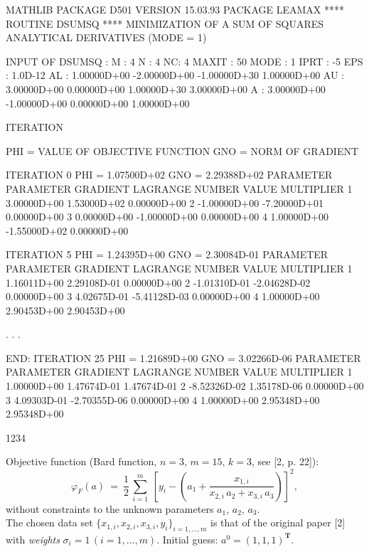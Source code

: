 \begin{Listing}
               MATHLIB PACKAGE   D501   VERSION 15.03.93
               PACKAGE LEAMAX  ****  ROUTINE DSUMSQ ****
   MINIMIZATION OF A SUM OF SQUARES   ANALYTICAL DERIVATIVES (MODE = 1)
 
INPUT  OF  DSUMSQ :
M :  4     N :  4     NC:  4    MAXIT :  50    MODE :  1    IPRT :  -5
EPS :  1.0D-12
AL :   1.00000D+00   -2.00000D+00   -1.00000D+30    1.00000D+00
AU :   3.00000D+00    0.00000D+00    1.00000D+30    3.00000D+00
A  :   3.00000D+00   -1.00000D+00    0.00000D+00    1.00000D+00
 
ITERATION
 
    PHI = VALUE OF OBJECTIVE FUNCTION          GNO = NORM OF GRADIENT
 
       ITERATION   0   PHI =  1.07500D+02      GNO =  2.29388D+02
       PARAMETER       PARAMETER         GRADIENT          LAGRANGE
         NUMBER          VALUE                            MULTIPLIER
            1          3.00000D+00      1.53000D+02      0.00000D+00
            2         -1.00000D+00     -7.20000D+01      0.00000D+00
            3          0.00000D+00     -1.00000D+00      0.00000D+00
            4          1.00000D+00     -1.55000D+02      0.00000D+00
 
       ITERATION   5   PHI =  1.24395D+00      GNO =  2.30084D-01
       PARAMETER       PARAMETER         GRADIENT          LAGRANGE
         NUMBER          VALUE                            MULTIPLIER
            1          1.16011D+00      2.29108D-01      0.00000D+00
            2         -1.01310D-01     -2.04628D-02      0.00000D+00
            3          4.02675D-01     -5.41128D-03      0.00000D+00
            4          1.00000D+00      2.90453D+00      2.90453D+00
 
      . . .
 
 END:  ITERATION  25   PHI =  1.21689D+00      GNO =  3.02266D-06
       PARAMETER       PARAMETER         GRADIENT          LAGRANGE
         NUMBER          VALUE                            MULTIPLIER
            1          1.00000D+00      1.47674D-01      1.47674D-01
            2         -8.52326D-02      1.35178D-06      0.00000D+00
            3          4.09303D-01     -2.70355D-06      0.00000D+00
            4          1.00000D+00      2.95348D+00      2.95348D+00
\end{Listing}
\newpage  
\begin{DL}{1234}
\item[\mathbf{(F)}]
Objective function (Bard function, $n=3,\,m=15,\,k=3$, see [2, p. 22]):
$$ \varphi_F(a) \ = \ \frac{1}{2} \, \sum_{i=1}^m \:
\left[y_i-\left(a_1+\frac{x_{1,i}}{x_{2,i}\,a_2+x_{3,i}\,a_3}\right)
\right]^2, $$
without constraints to the unknown parameters $a_1$, $a_2$, $a_3$. \\
The chosen data set $\{x_{1,i},x_{2,i},x_{3,i},y_i\}_{i=1,\ldots,m}$
is that of the original paper [2] with {\it weights}
$\sigma_i=1\,(i=1,\ldots,m)$.
Initial guess: $a^0=(1,1,1)^{\mathbf{T}}$. \\
\end{DL}

